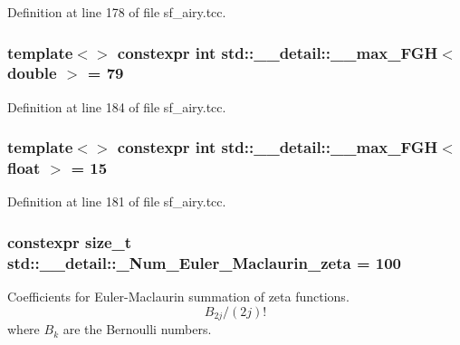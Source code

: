 Definition at line 178 of file sf\+\_\+airy.\+tcc.

\subsubsection[{\texorpdfstring{\+\_\+\+\_\+max\+\_\+\+F\+G\+H$<$ double $>$}{__max_FGH< double >}}]{\setlength{\rightskip}{0pt plus 5cm}template$<$$>$ constexpr int {\bf std\+::\+\_\+\+\_\+detail\+::\+\_\+\+\_\+max\+\_\+\+F\+GH}$<$ double $>$ = 79}\hypertarget{namespacestd_1_1____detail_ac945c3d1897eb356e75d379f67367a4b}{}\label{namespacestd_1_1____detail_ac945c3d1897eb356e75d379f67367a4b}


Definition at line 184 of file sf\+\_\+airy.\+tcc.

\subsubsection[{\texorpdfstring{\+\_\+\+\_\+max\+\_\+\+F\+G\+H$<$ float $>$}{__max_FGH< float >}}]{\setlength{\rightskip}{0pt plus 5cm}template$<$$>$ constexpr int {\bf std\+::\+\_\+\+\_\+detail\+::\+\_\+\+\_\+max\+\_\+\+F\+GH}$<$ float $>$ = 15}\hypertarget{namespacestd_1_1____detail_a67195934ce49105fd7b765e669a5a2a0}{}\label{namespacestd_1_1____detail_a67195934ce49105fd7b765e669a5a2a0}


Definition at line 181 of file sf\+\_\+airy.\+tcc.

\subsubsection[{\texorpdfstring{\+\_\+\+Num\+\_\+\+Euler\+\_\+\+Maclaurin\+\_\+zeta}{_Num_Euler_Maclaurin_zeta}}]{\setlength{\rightskip}{0pt plus 5cm}constexpr size\+\_\+t std\+::\+\_\+\+\_\+detail\+::\+\_\+\+Num\+\_\+\+Euler\+\_\+\+Maclaurin\+\_\+zeta = 100}\hypertarget{namespacestd_1_1____detail_ab27e687e1052be7a72de187e0dead124}{}\label{namespacestd_1_1____detail_ab27e687e1052be7a72de187e0dead124}
Coefficients for Euler-\/\+Maclaurin summation of zeta functions. \[ B_{2j} / (2j)! \] where $ B_k $ are the Bernoulli numbers. 

